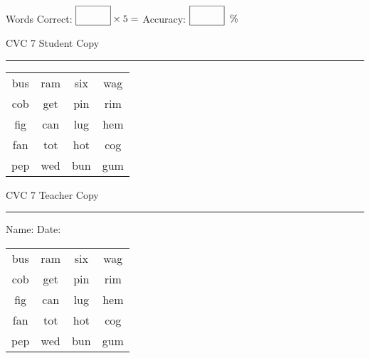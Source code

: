 \documentclass{memoir}
\begin{document}
\normalsize

Words Correct: $\fbox{\phantom{\huge 100}} \times 5 = $ Accuracy: $\fbox{\phantom{\huge 100}}\;\; \%$ 

\vfill

\newpage


\footnotesize \noindent
CVC 7 \hfill Student Copy
\smallskip
\hrule

\huge

\setlength{\tabcolsep}{14pt}
\def\arraystretch{2}

{\selectfont


\begin{vplace}[0.5]
\begin{center}
\begin{tabular}{cccc}
bus & ram & six & wag \\
cob & get & pin & rim \\
fig & can & lug & hem \\
fan & tot & hot & cog \\
pep & wed & bun & gum  \\
\end{tabular}
\end{center}
\end{vplace}

}

\newpage

\footnotesize \noindent
CVC 7 \hfill Teacher Copy
\smallskip
\hrule

\normalsize

\vfill

\noindent
Name: \underline{\hspace{1.75in}} \hfill Date: \underline{\hspace{1in}}

\huge

{\selectfont


\begin{vplace}[0.5]
\begin{center}
\begin{tabular}{cccc}
bus & ram & six & wag \\
cob & get & pin & rim \\
fig & can & lug & hem \\
fan & tot & hot & cog \\
pep & wed & bun & gum  \\
\end{tabular}
\end{center}
\end{vplace}



}
\end{document}
